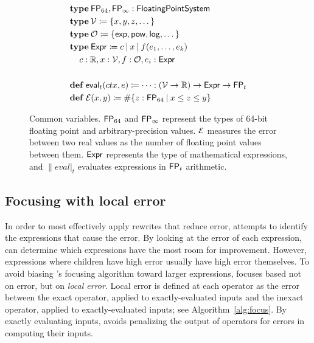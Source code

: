 \documentclass[paper.tex]{subfiles}
\begin{document}
\begin{figure}
\begin{footnotesize}
\begin{align*}
  &\!type!\:\FP_{64}, \FP_\infty : \|FloatingPointSystem| \\
  &\!type!\:\Var \ceq \{ x, y, z, \dotsc \} \\
  &\!type!\:\Op \ceq \{ \|exp|, \|pow|, \|log|, \dotsc \} \\
  &\!type!\:\Expr \ceq c \I x \I f(e_1, \dotsc, e_k) \\
  &\> c : \RR, x : \Var, f : \Op, e_i : \Expr \\
  \\
  &\!def!\:\|eval|_t(ctx, e)\ceq \dotsb : (\Var \to \RR) \to \Expr \to \FP_t \\
  &\!def!\:\Err(x, y) \ceq \#\{ z : \FP_{64}\:|\:x \le z \le y \}
\end{align*}
\end{footnotesize}
\caption{Common variables. $\mathsf{FP}_{64}$ and $\mathsf{FP}_\infty$ represent
  the types of 64-bit floating point and arbitrary-precision values.
  $\mathcal{E}$ measures the error between two real values
  as the number of floating point values between them.
  $\mathsf{Expr}$ represents the type of mathematical expressions,
  and $\|eval|_t$ evaluates expressions in $\mathsf{FP}_t$ arithmetic.}
\label{alg:defs}
\end{figure}

\subsection{Focusing with local error}

In order to most effectively apply rewrites that reduce error,
  \casio attempts to identify the expressions that cause the error.
By looking at the error of each expression,
  \casio can determine which expressions
  have the most room for improvement.
However, expressions where children have high error
  usually have high error themselves.
To avoid biasing \casio's focusing algorithm
  toward larger expressions, \casio focuses
  based not on error, but on \emph{local error}.
Local error is defined at each operator
  as the error between
  the exact operator, applied to exactly-evaluated inputs
  and the inexact operator, applied to exactly-evaluated inputs;
  see Algorithm~\ref{alg:focus}.
By exactly evaluating inputs,
  \casio avoids penalizing the output of operators
  for errors in computing their inputs.
\end{document}
